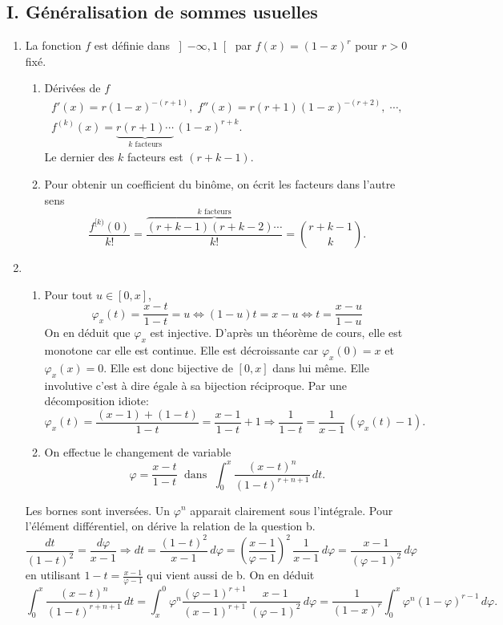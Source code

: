 \subsection*{I. Généralisation de sommes usuelles}
\begin{enumerate}
  \item La fonction $f$ est définie dans $\left] -\infty, 1 \right[$ par $f(x) = (1-x)^r$ pour $r>0$ fixé.
  \begin{enumerate}
    \item Dérivées de $f$
\begin{multline*}
  f'(x) = r(1-x)^{-(r+1)}, \; f''(x) = r(r+1)(1-x)^{-(r+2)}, \; \cdots ,\\
  f^{(k)}(x) = \underset{k \text{ facteurs}}{\underbrace{r(r+1) \cdots }}\,(1-x)^{r+k}.
\end{multline*}
Le dernier des $k$ facteurs est $(r+k-1)$. 

    \item  Pour obtenir un coefficient du binôme, on écrit les facteurs dans l'autre sens
\[
  \frac{f^{[k)}(0)}{k!} = \frac{\overset{k \text{ facteurs}}{\overbrace{(r+k-1)(r+k-2) \cdots}}}{k!}
  =\binom{r+k-1}{k}.
\]
  \end{enumerate}

  \item
  \begin{enumerate}
    \item Pour tout $u \in \left[ 0,x \right]$,
\[
  \varphi_x(t) = \frac{x-t}{1-t} = u \Leftrightarrow (1-u)t = x - u \Leftrightarrow t = \frac{x-u}{1-u}
\]
On en déduit que $\varphi_x$ est injective. D'après un théorème de cours, elle est monotone car elle est continue. Elle est décroissante car $\varphi_x(0) = x$ et $\varphi_x(x) = 0$. Elle est donc bijective de $\left[0 ,x \right]$ dans lui même. Elle involutive c'est à dire égale à sa bijection réciproque.\newline
Par une décomposition idiote:
\[
  \varphi_x(t)= \frac{(x-1) + (1-t) }{1-t} = \frac{x-1}{1-t} + 1
  \Rightarrow
  \frac{1}{1-t} = \frac{1}{x - 1}\, (\varphi_x(t) - 1).
\]

    \item On effectue le changement de variable
\[
  \varphi = \frac{x - t}{1 - t} \;\text{ dans }\; \int_0^x \frac{(x-t)^n}{(1-t)^{r+n+1}}\, dt.
\]
  \end{enumerate}
Les bornes sont inversées. Un $\varphi^n$ apparait clairement sous l'intégrale. Pour l'élément différentiel, on dérive la relation de la question b.
\[
  \frac{dt}{(1-t)^2} = \frac{d\varphi}{x-1} \Rightarrow 
  dt = \frac{(1-t)^2}{x-1}\,d\varphi 
  = \left(\frac{x-1}{\varphi - 1}\right)^2\,\frac{1}{x-1}\, d\varphi
  = \frac{x-1}{(\varphi - 1)^2}\, d\varphi
\]
en utilisant $1-t = \frac{x-1}{\varphi - 1}$ qui vient aussi de b. On en déduit
\[
  \int_0^x \frac{(x-t)^n}{(1-t)^{r+n+1}}\, dt =
  \int_x^0 \varphi^n \frac{(\varphi - 1)^{r+1}}{(x-1)^{r+1}}\, \frac{x-1}{(\varphi - 1)^2}\, d\varphi
  = \frac{1}{(1-x)^r}\int_0^x \varphi^n (1-\varphi)^{r-1}\,d\varphi .
\]


\end{enumerate}
